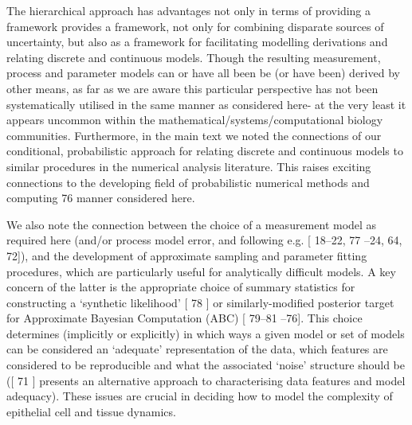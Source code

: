 \documentclass[10pt,letterpaper]{article}
\providecommand{\DIFaddtex}[1]{{\protect\color{blue} \sf #1}} %
\providecommand{\DIFdeltex}[1]{{\protect\color{red} \scriptsize #1}} %
\providecommand{\DIFaddbegin}{} %
\providecommand{\DIFaddend}{} %
\providecommand{\DIFdelbegin}{} %
\providecommand{\DIFdelend}{} %
\providecommand{\DIFadd}[1]{\texorpdfstring{\DIFaddtex{#1}}{#1}} %
\providecommand{\DIFdel}[1]{\texorpdfstring{\DIFdeltex{#1}}{}} %
\begin{document}
The hierarchical approach \DIFdelbegin \DIFdel{has advantages not only in terms of providing
a framework}\DIFdelend \DIFaddbegin \DIFadd{provides a framework, not only }\DIFaddend for combining
disparate sources of uncertainty, but also \DIFdelbegin \DIFdel{as
a framework }\DIFdelend for facilitating modelling
derivations and relating discrete and continuous models. Though the
resulting measurement, process and parameter models can \DIFdelbegin \DIFdel{or have all been}\DIFdelend \DIFaddbegin \DIFadd{be (or have
been) }\DIFaddend derived by other means, as far as we are aware this particular
perspective has not been systematically utilised in the \DIFdelbegin \DIFdel{same manner
as considered here- at the very least it
appears uncommon within the mathematical/systems/computational biology
communities.
Furthermore, in the main text we noted the connections of
our conditional, probabilistic approach for relating discrete and
continuous models to similar procedures in the numerical analysis
literature. This raises exciting connections to the developing field of
probabilistic numerical methods and computing }%
\DIFdel{76}%
\DIFdelend \DIFaddbegin \DIFadd{manner
considered here}\DIFaddend .

We also note the connection between the choice of a measurement model as
required here (and/or process model error, and following e.g. {[}\DIFdelbegin \DIFdel{18--22,
77}\DIFdelend \DIFaddbegin \DIFadd{21--24,
64, 72}\DIFaddend {]}), and the development of approximate sampling and parameter
fitting procedures, which are particularly useful for analytically
difficult models. A key concern of the latter is the appropriate choice
of summary statistics for constructing a `synthetic likelihood' {[}\DIFdelbegin \DIFdel{78}\DIFdelend \DIFaddbegin \DIFadd{73}\DIFaddend {]}
or similarly-modified posterior target for Approximate Bayesian
Computation (ABC) {[}\DIFdelbegin \DIFdel{79--81}\DIFdelend \DIFaddbegin \DIFadd{74--76}\DIFaddend {]}. This choice determines (implicitly or
explicitly) in which ways a given model or set of models can be
considered an `adequate' representation of the data, which features are
considered to be reproducible and what the associated `noise' structure
should be ({[}\DIFdelbegin \DIFdel{71}\DIFdelend \DIFaddbegin \DIFadd{77}\DIFaddend {]} presents an alternative approach to characterising
data features and model adequacy). These issues are crucial in deciding
how to model the complexity of epithelial cell and tissue dynamics.
\end{document}
